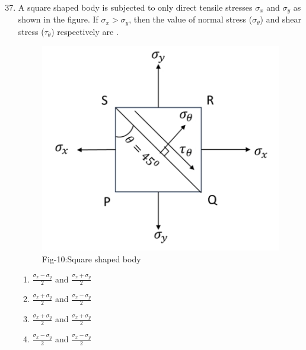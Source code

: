 \documentclass[journal]{IEEEtran}
\theoremstyle{remark}
\begin{document}
\begin{enumerate}[itemsep=1em]
\setcounter{enumi}{36}
\item A square shaped body is subjected to only direct tensile stresses $\sigma_x$ and $\sigma_y$ as shown in the figure. If $\sigma_x>\sigma_y$, then the value of normal stress ($\sigma_{\theta}$) and shear stress ($\tau_{\theta}$) 
respectively are \underline{\hspace{2cm}}.
\begin{figure}[H]
    \centering
    \includegraphics[width=0.4\columnwidth]{figs/fig-10.jpeg}
    \caption*{Fig-10:Square shaped body}
    \label{fig:10}
\end{figure}

\begin{multicols}{4}
\begin{enumerate}
    \item $\frac{\sigma_x-\sigma_y}{2}$ and $\frac{\sigma_x+\sigma_y}{2}$
    \item $\frac{\sigma_x+\sigma_y}{2}$ and $\frac{\sigma_x-\sigma_y}{2}$
    \item $\frac{\sigma_x+\sigma_y}{2}$ and $\frac{\sigma_x+\sigma_y}{2}$
    \item $\frac{\sigma_x-\sigma_y}{2}$ and $\frac{\sigma_x-\sigma_y}{2}$
\end{enumerate}    
\end{multicols}
\end{enumerate}
\end{document}
